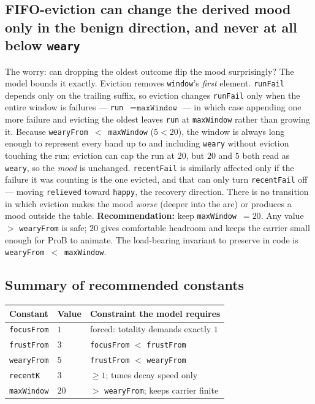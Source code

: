 \documentclass[a4paper,10pt,fleqn]{article}
\begin{document}
\subsection{FIFO-eviction can change the derived mood only in the benign
direction, and never at all below \texttt{weary}}
\label{find:evict}

The worry: can dropping the oldest outcome flip the mood surprisingly? The model
bounds it exactly. Eviction removes \texttt{window}'s \emph{first} element.
\texttt{runFail} depends only on the trailing suffix, so eviction changes
\texttt{runFail} only when the entire window is failures --- \texttt{run}~$=
\texttt{maxWindow}$ --- in which case appending one more failure and evicting the
oldest leaves \texttt{run} at \texttt{maxWindow} rather than growing it. Because
\texttt{wearyFrom}~$<$~\texttt{maxWindow} ($5 < 20$), the window is always long
enough to represent every band up to and including \texttt{weary} without
eviction touching the run; eviction can cap the run at $20$, but $20$ and $5$ both
read as \texttt{weary}, so the \emph{mood} is unchanged. \texttt{recentFail} is
similarly affected only if the failure it was counting is the one evicted, and
that can only turn \texttt{recentFail} off --- moving \texttt{relieved} toward
\texttt{happy}, the recovery direction. There is no transition in which eviction
makes the mood \emph{worse} (deeper into the arc) or produces a mood outside the
table. \textbf{Recommendation:} keep \texttt{maxWindow}~$=20$. Any value $>$
\texttt{wearyFrom} is safe; $20$ gives comfortable headroom and keeps the
carrier small enough for ProB to animate. The load-bearing invariant to preserve
in code is \texttt{wearyFrom}~$<$~\texttt{maxWindow}.

\subsection{Summary of recommended constants}

\begin{center}
\begin{tabular}{lll}
\textbf{Constant} & \textbf{Value} & \textbf{Constraint the model requires} \\
\hline
\texttt{focusFrom}  & $1$  & forced: totality demands exactly $1$ \\
\texttt{frustFrom}  & $3$  & \texttt{focusFrom} $<$ \texttt{frustFrom} \\
\texttt{wearyFrom}  & $5$  & \texttt{frustFrom} $<$ \texttt{wearyFrom} \\
\texttt{recentK}    & $3$  & $\geq 1$; tunes decay speed only \\
\texttt{maxWindow}  & $20$ & $>$ \texttt{wearyFrom}; keeps carrier finite \\
\end{tabular}
\end{center}
\end{document}
